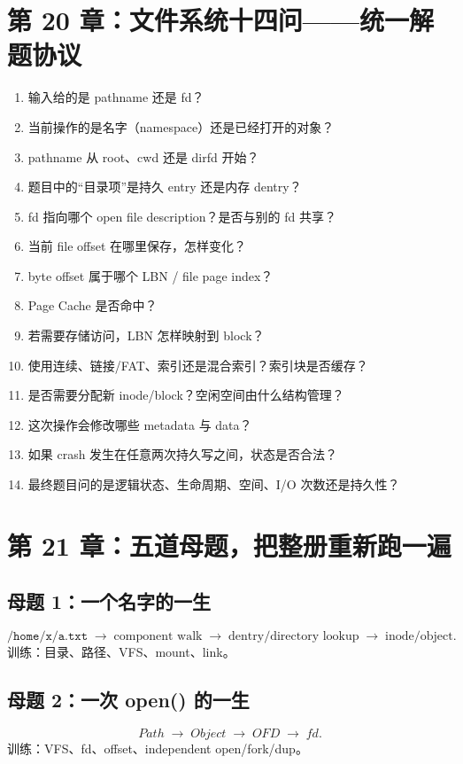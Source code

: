 \documentclass[11pt,a4paper]{ctexart}
\newcommand{\arr}{\;\longrightarrow\;}
\begin{document}
\section{第 20 章：文件系统十四问——统一解题协议}
\begin{method}
\begin{enumerate}
  \item 输入给的是 pathname 还是 fd？
  \item 当前操作的是名字（namespace）还是已经打开的对象？
  \item pathname 从 root、cwd 还是 dirfd 开始？
  \item 题目中的“目录项”是持久 entry 还是内存 dentry？
  \item fd 指向哪个 open file description？是否与别的 fd 共享？
  \item 当前 file offset 在哪里保存，怎样变化？
  \item byte offset 属于哪个 LBN / file page index？
  \item Page Cache 是否命中？
  \item 若需要存储访问，LBN 怎样映射到 block？
  \item 使用连续、链接/FAT、索引还是混合索引？索引块是否缓存？
  \item 是否需要分配新 inode/block？空闲空间由什么结构管理？
  \item 这次操作会修改哪些 metadata 与 data？
  \item 如果 crash 发生在任意两次持久写之间，状态是否合法？
  \item 最终题目问的是逻辑状态、生命周期、空间、I/O 次数还是持久性？
\end{enumerate}
\end{method}

\section{第 21 章：五道母题，把整册重新跑一遍}
\subsection*{母题 1：一个名字的一生}
\[
\texttt{/home/x/a.txt}\arr\text{component walk}\arr\text{dentry/directory lookup}\arr\text{inode/object}.
\]
训练：目录、路径、VFS、mount、link。

\subsection*{母题 2：一次 open() 的一生}
\[
Path\arr Object\arr OFD\arr fd.
\]
训练：VFS、fd、offset、independent open/fork/dup。
\end{document}

